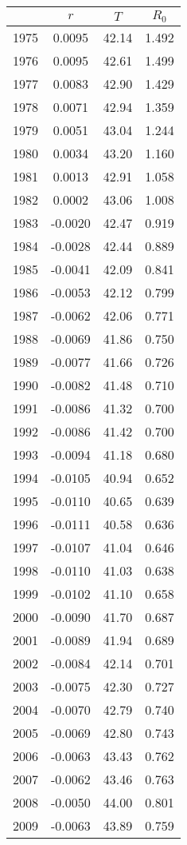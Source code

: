 \begin{tabular}{cccc}
  \hline
 & $r$ & $T$ & $R_0$ \\ 
  \hline
1975 & 0.0095 & 42.14 & 1.492 \\ 
  1976 & 0.0095 & 42.61 & 1.499 \\ 
  1977 & 0.0083 & 42.90 & 1.429 \\ 
  1978 & 0.0071 & 42.94 & 1.359 \\ 
  1979 & 0.0051 & 43.04 & 1.244 \\ 
  1980 & 0.0034 & 43.20 & 1.160 \\ 
  1981 & 0.0013 & 42.91 & 1.058 \\ 
  1982 & 0.0002 & 43.06 & 1.008 \\ 
  1983 & -0.0020 & 42.47 & 0.919 \\ 
  1984 & -0.0028 & 42.44 & 0.889 \\ 
  1985 & -0.0041 & 42.09 & 0.841 \\ 
  1986 & -0.0053 & 42.12 & 0.799 \\ 
  1987 & -0.0062 & 42.06 & 0.771 \\ 
  1988 & -0.0069 & 41.86 & 0.750 \\ 
  1989 & -0.0077 & 41.66 & 0.726 \\ 
  1990 & -0.0082 & 41.48 & 0.710 \\ 
  1991 & -0.0086 & 41.32 & 0.700 \\ 
  1992 & -0.0086 & 41.42 & 0.700 \\ 
  1993 & -0.0094 & 41.18 & 0.680 \\ 
  1994 & -0.0105 & 40.94 & 0.652 \\ 
  1995 & -0.0110 & 40.65 & 0.639 \\ 
  1996 & -0.0111 & 40.58 & 0.636 \\ 
  1997 & -0.0107 & 41.04 & 0.646 \\ 
  1998 & -0.0110 & 41.03 & 0.638 \\ 
  1999 & -0.0102 & 41.10 & 0.658 \\ 
  2000 & -0.0090 & 41.70 & 0.687 \\ 
  2001 & -0.0089 & 41.94 & 0.689 \\ 
  2002 & -0.0084 & 42.14 & 0.701 \\ 
  2003 & -0.0075 & 42.30 & 0.727 \\ 
  2004 & -0.0070 & 42.79 & 0.740 \\ 
  2005 & -0.0069 & 42.80 & 0.743 \\ 
  2006 & -0.0063 & 43.43 & 0.762 \\ 
  2007 & -0.0062 & 43.46 & 0.763 \\ 
  2008 & -0.0050 & 44.00 & 0.801 \\ 
  2009 & -0.0063 & 43.89 & 0.759 \\ 
   \hline
\end{tabular}
